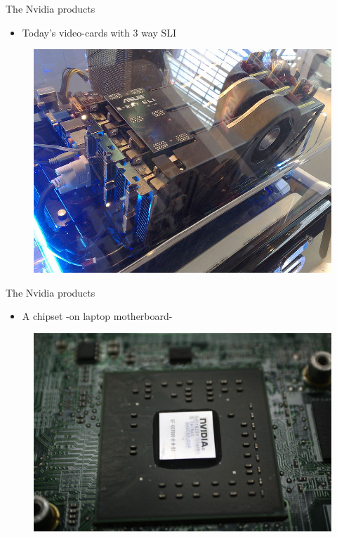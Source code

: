 \documentclass{beamer}
\begin{document}
\begin{frame}{The Nvidia products}
	\transdissolve[duration=0.08]
	\begin{itemize}
		\item<+->{Today's video-cards with 3 way SLI}
	\end{itemize}
	\begin{figure}[h]
		\includegraphics[width=1.00\textheight]{images/SLI.jpg}
	\end{figure}
\end{frame}

\begin{frame}{The Nvidia products}
	\transdissolve[duration=0.08]
	\begin{itemize}
		\item<+->{A chipset -on laptop motherboard- }
	\end{itemize}
	\begin{figure}[h]
		\includegraphics[width=1.00\textheight]{images/chipset_motherboard.jpg}
	\end{figure}
\end{frame}
\end{document}
